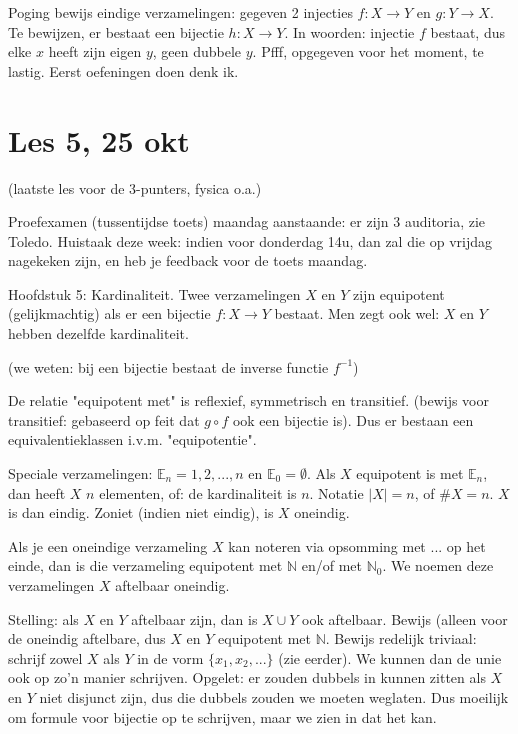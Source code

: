 \documentclass{article}
\begin{document}
Poging bewijs eindige verzamelingen: gegeven 2 injecties $f:X \rightarrow Y$ en $g:Y \rightarrow X$. Te bewijzen, er bestaat een bijectie $h: X \rightarrow Y$. In woorden: injectie $f$ bestaat, dus elke $x$ heeft zijn eigen $y$, geen dubbele $y$. Pfff, opgegeven voor het moment, te lastig. Eerst oefeningen doen denk ik. 


\section{Les 5, 25 okt}

(laatste les voor de 3-punters, fysica o.a.)

Proefexamen (tussentijdse toets) maandag aanstaande: er zijn 3 auditoria, zie Toledo. 
Huistaak deze week: indien voor donderdag 14u, dan zal die op vrijdag nagekeken zijn, en heb je feedback voor de toets maandag. 

Hoofdstuk 5: Kardinaliteit. 
Twee verzamelingen $X$ en $Y$ zijn equipotent (gelijkmachtig) als er een bijectie $f: X \rightarrow Y$ bestaat. Men zegt ook wel: $X$ en $Y$ hebben dezelfde kardinaliteit. 

(we weten: bij een bijectie bestaat de inverse functie $f^{-1}$) 

De relatie "equipotent met" is reflexief, symmetrisch en transitief. (bewijs voor transitief: gebaseerd op feit dat $g \circ f$ ook een bijectie is). Dus er bestaan een equivalentieklassen i.v.m. "equipotentie".

Speciale verzamelingen: $ \mathbb{E}_n = {1,2,...,n}$ en $\mathbb{E}_0 = \emptyset$. Als $X$ equipotent is met $\mathbb{E}_n$, dan heeft $X$ $n$ elementen, of: de kardinaliteit is $n$. Notatie $|X| = n$, of $ \# X=n$. $X$ is dan eindig. Zoniet (indien niet eindig), is $X$ oneindig. 

Als je een oneindige verzameling $X$ kan noteren via opsomming met $...$ op het einde, dan is die verzameling equipotent met $\mathbb{N}$ en/of met  $\mathbb{N}_0$. We noemen deze verzamelingen $X$ aftelbaar oneindig. 

Stelling: als $X$ en $Y$ aftelbaar zijn, dan is $X \cup Y$ ook aftelbaar. 
Bewijs (alleen voor de oneindig aftelbare, dus $X$ en $Y$ equipotent met $\mathbb{N}$. 
Bewijs redelijk triviaal: schrijf zowel $X$ als $Y$ in de vorm $\{x_1, x_2, ...\}$ (zie eerder). We kunnen dan de unie ook op zo'n manier schrijven. Opgelet: er zouden dubbels in kunnen zitten als $X$ en $Y$ niet disjunct zijn, dus die dubbels zouden we moeten weglaten. Dus moeilijk om formule voor bijectie op te schrijven, maar we zien in dat het kan. 
\end{document}
